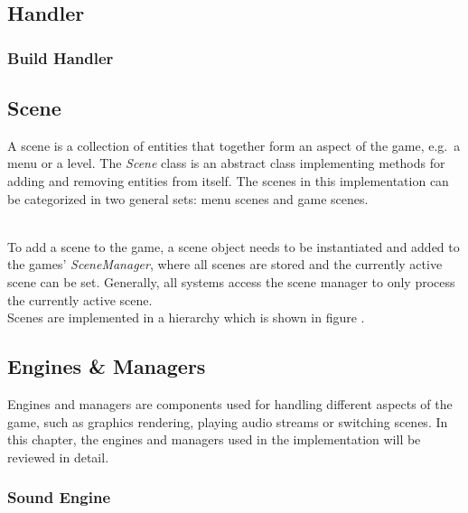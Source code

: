 \subsection{Handler}\label{subsec:handler}

\subsubsection{Build Handler}\label{subsubsec:build-handler}


\subsection{Scene}\label{subsec:scenes}
A scene is a collection of entities that together form an aspect of the game, e.g.\ a menu or a level.
The \textit{Scene} class is an abstract class implementing methods for adding and removing entities from itself.
The scenes in this implementation can be categorized in two general sets: menu scenes and game scenes.

\\
To add a scene to the game, a scene object needs to be instantiated and added to the games' \textit{SceneManager}, where all
scenes are stored and the currently active scene can be set.
Generally, all systems access the scene manager to only process the currently active scene.
\\

Scenes are implemented in a hierarchy which is shown in figure .

\subsection{Engines \& Managers}\label{subsec:engines}
Engines and managers are components used for handling different aspects of the game, such as graphics rendering, playing audio streams
or switching scenes.
In this chapter, the engines and managers used in the implementation will be reviewed in detail.



\subsubsection{Sound Engine}\label{subsubsec:sound-engine}

